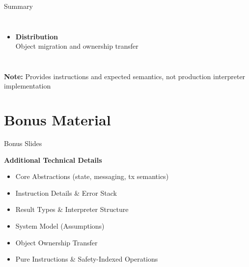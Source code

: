 \documentclass[handout,aspectratio=169,xcolor=dvipsnames,10pt]{beamer}
\begin{document}
\begin{frame}{Summary}
\begin{columns}[T]
\begin{itemize}
  \item \textbf{Distribution} \\
  {\small Object migration and ownership transfer}
\end{itemize}
\end{columns}

\vspace{0.5em}

{\footnotesize\textbf{Note:} Provides instructions and expected semantics, not production interpreter implementation}

\vfill

\end{frame}




\section*{Bonus Material}


\begin{frame}{Bonus Slides}

\vfill

\begin{center}
\Large \textbf{Additional Technical Details}
\end{center}

\vspace{1em}

\centering
\begin{itemize}
  \item Core Abstractions (state, messaging, tx semantics)
  \item Instruction Details \& Error Stack
  \item Result Types \& Interpreter Structure
  \item System Model (Assumptions)
  \item Object Ownership Transfer
  \item Pure Instructions \& Safety-Indexed Operations
\end{itemize}

\vfill

\end{frame}
\end{document}
